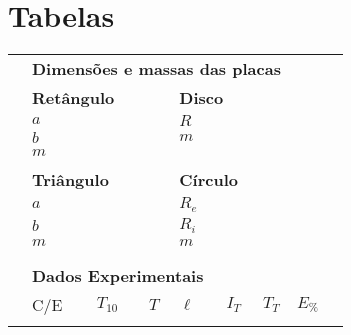 \vfill
\pagebreak
\section{Tabelas}

\begin{table*}[!ht]
    \centering
    \begin{tabular}{lp{30mm}p{19mm}p{19mm}p{19mm}p{19mm}p{19mm}p{19mm}l}
    \toprule
        & \multicolumn{6}{l}{\textbf{Dimensões e massas das placas}} \\
    \cmidrule{2-6}
        &\multicolumn{2}{l}{\textbf{Retângulo}} & & \multicolumn{2}{l}{\textbf{Disco}} & \\
        \cmidrule{2-3} \cmidrule{5-6}
        & $a$ \cellcolor[gray]{0.89} & \cellcolor[gray]{0.92} & & $R$ \cellcolor[gray]{0.89} & \cellcolor[gray]{0.92} \\
        & $b$ \cellcolor[gray]{0.95} & \cellcolor[gray]{0.97} & & $m$ \cellcolor[gray]{0.95} & \cellcolor[gray]{0.97} \\
        & $m$ \cellcolor[gray]{0.89} & \cellcolor[gray]{0.92} & & \\
        \cmidrule{2-3} \cmidrule{5-6}
        \\
        &\multicolumn{2}{l}{\textbf{Triângulo}} & & \multicolumn{2}{l}{\textbf{Círculo}} \\
        \cmidrule{2-3} \cmidrule{5-6}
        & $a$ \cellcolor[gray]{0.89} & \cellcolor[gray]{0.92} & & $R_e$ \cellcolor[gray]{0.89} & \cellcolor[gray]{0.92} \\
        & $b$ \cellcolor[gray]{0.95} & \cellcolor[gray]{0.97} & & $R_i$\cellcolor[gray]{0.95} & \cellcolor[gray]{0.97} \\
        & $m$ \cellcolor[gray]{0.89} & \cellcolor[gray]{0.92} & & $m$ \cellcolor[gray]{0.89} & \cellcolor[gray]{0.92} \\
        \cmidrule{2-3} \cmidrule{5-6}
        \\
        \\
        &\multicolumn{4}{l}{\textbf{Dados Experimentais}} \\
        \cmidrule{2-8}
        & C/E & $T_{10}$ & $T$ & $\ell$ & $I_T$ & $T_T$ & $E_\%$ & \\
        \cmidrule{2-8}
        & \cellcolor[gray]{0.89} & \cellcolor[gray]{0.92} & \cellcolor[gray]{0.89} & \cellcolor[gray]{0.92} & \cellcolor[gray]{0.89} & \cellcolor[gray]{0.92} & \cellcolor[gray]{0.89} \\

\end{tabular}
\end{table*}
